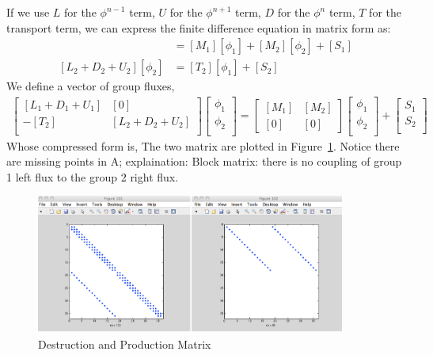 \documentclass{school-22.211-notes}
\begin{document}
\clearpage
{}
If we use $L$ for the $\phi^{n-1}$ term, $U$ for the $\phi^{n+1}$ term, $D$ for the $\phi^n$ term, $T$ for the transport term, we can express the finite difference equation in matrix form as: 
\begin{align}
[L_1 + D_1 + U_1] [\phi_1] &= [M_1] [\phi_1] + [M_2][\phi_2] + [S_1] \\
[L_2 + D_2 + U_2] [\phi_2] &= [T_2] [\phi_1] + [S_2] 
\end{align}
We define a vector of group fluxes, 
\begin{align}
\left[ \begin{array}{cc} 
[L_1 + D_1 + U_1] & [0] \\
-[T_2] & [L_2 + D_2 + U_2] \\
\end{array} \right] 
\left[ \begin{array}{c}
\phi_1 \\ \phi_2 \\ \end{array} \right] 
= \left[ {\begin{array}{cc} \left[M_1\right] & \left[M_2\right] \\ \left[0\right] & \left[0\right] \end{array}} \right] 
\left[ \begin{array}{c}
\phi_1 \\ \phi_2 \\ \end{array} \right] 
+ 
\left[ \begin{array}{c} 
S_1 \\ S_2 \\ \end{array} \right] 
\end{align}
Whose compressed form is, 
\eqn{ [A] [\phi] = [M] [\phi] + [S] }
The two matrix are plotted in Figure~\ref{matrix-form}. Notice there are missing points in A; explaination: Block matrix: there is no coupling of group 1 left flux to the group 2 right flux. 
\begin{figure}
  \centering
  \includegraphics[width=4in]{images/dfs/matrix-form.png}
  \caption{Destruction and Production Matrix} \label{matrix-form}
\end{figure}
\end{document}
